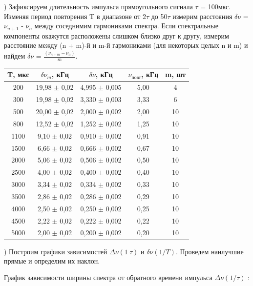 \documentclass[a4paper,12pt]{article}
\begin{document}
) Зафиксируем длительность импульса прямоугольного сигнала $\tau$ = 100мкс. Изменяя период повторения T в диапазоне от 2$\tau$ до 50$\tau$ измерим расстояния $\delta\nu$ = $\nu_{n+1}$ - $\nu_n$ между соседнимим гармониками спектра. Если спектральные компоненты окажутся расположены слишком близко друг к другу, измерим расстояние между (n + m)-й и m-й гармониками (для некоторых целых n и m) и найдем $\delta\nu$ = $\frac{(\nu_{n+m}-\nu_n)}{m}$. 

\begin{center}
\begin{tabular}{|c|c|c|c|c|}
	\hline
	T, мкс & $\delta\nu_m$, кГц & $\delta\nu$, кГц & $\nu_{\text{повт}}$, кГц & m, шт \\
	\hline
	200 & 19,98 $\pm$ 0,02 & 4,995 $\pm$ 0,005 & 5,00 & 4 \\
	\hline
	300 & 19,98 $\pm$ 0,02 & 3,330 $\pm$ 0,003  & 3,33 & 6 \\
	\hline
	500 & 20,00 $\pm$ 0,02 & 2,000 $\pm$ 0,002 & 2,00 & 10 \\
	\hline
	800 & 12,52 $\pm$ 0,02 & 1,252 $\pm$ 0,002  & 1,25 & 10 \\
	\hline
	1100 & 9,10 $\pm$ 0,02 & 0,910 $\pm$ 0,002  & 0,91 & 10 \\
	\hline
	1500 & 6,66 $\pm$ 0,02  & 0,666 $\pm$ 0,002   & 0,67 & 10 \\
	\hline
	2000 & 5,06 $\pm$ 0,02  & 0,506 $\pm$ 0,002  & 0,50 & 10 \\
	\hline
	2500 & 4,00 $\pm$ 0,02  & 0,400 $\pm$ 0,002   & 0,40 & 10 \\
	\hline
	3000 & 3,34 $\pm$ 0,02  & 0,334 $\pm$ 0,002  & 0,33 & 10 \\
	\hline
	3500 & 2,86 $\pm$ 0,02  & 0,286 $\pm$ 0,002  & 0,29 & 10 \\
	\hline
	4000 & 2,50 $\pm$ 0,02  & 0,250 $\pm$ 0,002  & 0,25 & 10 \\
	\hline
	4500 & 2,22 $\pm$ 0,02  & 0,222 $\pm$ 0,002  & 0,22 & 10 \\
	\hline
	5000 & 2,00 $\pm$ 0,02  & 0,200 $\pm$ 0,002  & 0,20 & 10 \\
	\hline
\end{tabular}
\end{center}

) Построим графики зависимостей $\Delta\nu(1\ \tau)$ и $\delta\nu(1/T)$. Проведем наилучшие прямые и определим их наклон. 

\par График зависимости ширины спектра от обратного времени импульса $\Delta\nu(1/\tau)$ :
\end{document}
